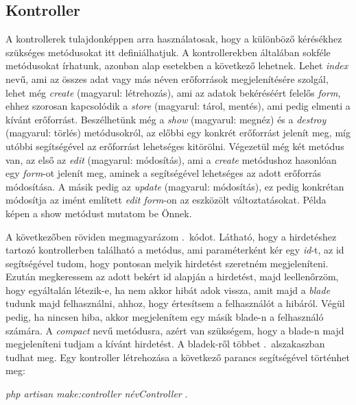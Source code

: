 \documentclass[]{thesis-ekf}
\theoremstyle{definition}
\theoremstyle{remark}
\begin{document}
	\subsection{Kontroller}\label{sc-kontroller}
		A kontrollerek tulajdonképpen arra használatosak, hogy a különböző kérésékhez szükséges metódusokat itt definiálhatjuk. A kontrollerekben általában sokféle metódusokat írhatunk, azonban alap esetekben a következő lehetnek. Lehet \emph{index} nevű, ami az összes adat vagy más néven erőforrások megjelenítésére szolgál, lehet még \emph{create} (magyarul: létrehozás), ami az adatok bekéréséért felelős \emph{form}, ehhez szorosan kapcsolódik a \emph{store} (magyarul: tárol, mentés), ami pedig elmenti a kívánt erőforrást. Beszélhetünk még a \emph{show} (magyarul: megnéz) és a \emph{destroy} (magyarul: törlés) metódusokról, az előbbi egy konkrét erőforrást jelenít meg, míg utóbbi segítségével az erőforrást lehetséges kitörölni. Végezetül még két metódus van, az első az \emph{edit} (magyarul: módosítás), ami a \emph{create} metódushoz hasonlóan egy \emph{form}-ot jelenít meg, aminek a segítségével lehetséges az adott erőforrás módosítása. A másik pedig az \emph{update} (magyarul: módosítás), ez pedig konkrétan módosítja az imént említett \emph{edit form}-on az eszközölt változtatásokat. Példa képen a show metódust mutatom be Önnek. \cite{Laravel}
	
		
	
			A következőben röviden megmagyarázom .~kódot. Látható, hogy a hirdetéshez tartozó kontrollerben található a metódus, ami paraméterként kér egy \emph{id}-t, az id segítségével tudom, hogy pontosan melyik hirdetést szeretném megjeleníteni. Ezután megkeressem az adott bekért id alapján a hirdetést, majd leellenőrzöm, hogy egyáltalán létezik-e, ha nem akkor hibát adok vissza, amit majd a \emph{blade} tudunk majd felhasználni, ahhoz, hogy értesítsem a felhasználót a hibáról. Végül pedig, ha nincsen hiba, akkor megjelenítem egy másik blade-n a felhasználó számára. A \emph{compact} nevű metódusra, azért van szükségem, hogy a blade-n majd megjeleníteni tudjam a kívánt hirdetést. A bladek-ről többet .~alszakaszban tudhat meg.  Egy kontroller létrehozása a következő parancs segítségével történhet meg:
		\begin{center} 
			\emph{php artisan make:controller névController} .
		\end{center}
		  
\end{document}
